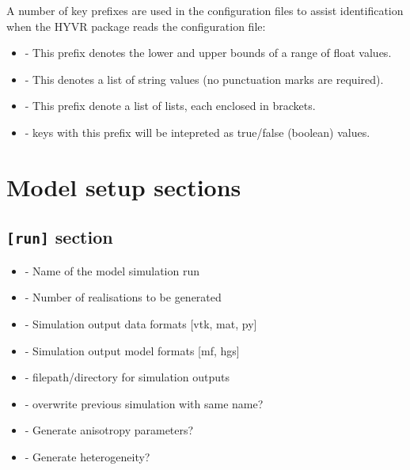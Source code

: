 \documentclass[letterpaper,10pt,english]{sphinxmanual}
\begin{document}
A number of key prefixes are used in the configuration files to assist identification when the HYVR package reads the configuration file:
\begin{itemize}
\item {} 
 - This prefix denotes the lower and upper bounds of a range of float values.

\item {} 
 - This denotes a list of string values (no punctuation marks are required).

\item {} 
 - This prefix denote a list of lists, each enclosed in brackets.

\item {} 
 - keys with this prefix will be intepreted as true/false (boolean) values.

\end{itemize}


\section{Model setup sections}
\label{example:model-setup-sections}

\subsection{\texttt{{[}run{]}} section}
\label{example:run-section}\begin{itemize}
\item {} 
                           - Name of the model simulation run

\item {} 
                            - Number of realisations to be generated

\item {} 
                     - Simulation output data formats {[}vtk, mat, py{]}

\item {} 
            - Simulation output model formats {[}mf, hgs{]}

\item {} 
                                        - filepath/directory for simulation outputs

\item {} 
                           - overwrite previous simulation with same name?

\item {} 
           - Generate anisotropy parameters?

\item {} 
                          - Generate heterogeneity?

\end{itemize}
\end{document}
